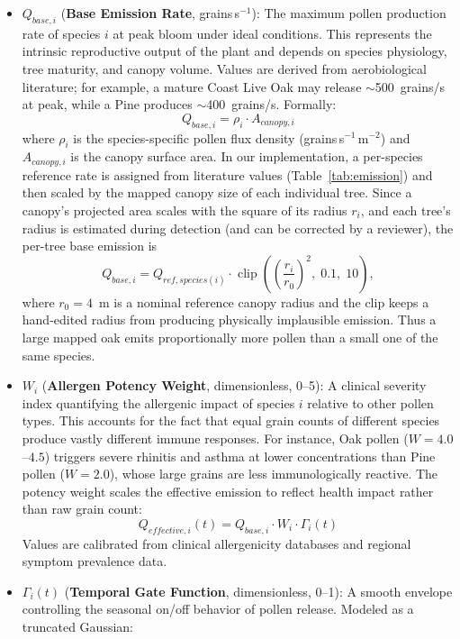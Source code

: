\documentclass[11pt]{article}
\begin{document}
\begin{itemize}
    \item $Q_{base,i}$ (\textbf{Base Emission Rate}, grains\,s$^{-1}$): The maximum pollen production rate of species $i$ at peak bloom under ideal conditions. This represents the intrinsic reproductive output of the plant and depends on species physiology, tree maturity, and canopy volume. Values are derived from aerobiological literature; for example, a mature Coast Live Oak may release $\sim$500~grains/s at peak, while a Pine produces $\sim$400~grains/s. Formally:
    \begin{equation}
    Q_{base,i} = \rho_i \cdot A_{canopy,i}
    \end{equation}
    where $\rho_i$ is the species-specific pollen flux density (grains\,s$^{-1}$\,m$^{-2}$) and $A_{canopy,i}$ is the canopy surface area. In our implementation, a per-species reference rate is assigned from literature values (Table~\ref{tab:emission}) and then scaled by the mapped canopy size of each individual tree. Since a canopy's projected area scales with the square of its radius $r_i$, and each tree's radius is estimated during detection (and can be corrected by a reviewer), the per-tree base emission is
    \begin{equation}
    Q_{base,i} = Q_{ref,species(i)} \cdot \operatorname{clip}\!\left(\left(\frac{r_i}{r_0}\right)^2,\; 0.1,\; 10\right),
    \label{eq:area_scaling}
    \end{equation}
    where $r_0 = 4$~m is a nominal reference canopy radius and the clip keeps a hand-edited radius from producing physically implausible emission. Thus a large mapped oak emits proportionally more pollen than a small one of the same species.

    \item $W_i$ (\textbf{Allergen Potency Weight}, dimensionless, 0--5): A clinical severity index quantifying the allergenic impact of species $i$ relative to other pollen types. This accounts for the fact that equal grain counts of different species produce vastly different immune responses. For instance, Oak pollen ($W = 4.0$--$4.5$) triggers severe rhinitis and asthma at lower concentrations than Pine pollen ($W = 2.0$), whose large grains are less immunologically reactive. The potency weight scales the effective emission to reflect health impact rather than raw grain count:
    \begin{equation}
    Q_{effective,i}(t) = Q_{base,i} \cdot W_i \cdot \Gamma_i(t)
    \end{equation}
    Values are calibrated from clinical allergenicity databases and regional symptom prevalence data.

    \item $\Gamma_i(t)$ (\textbf{Temporal Gate Function}, dimensionless, 0--1): A smooth envelope controlling the seasonal on/off behavior of pollen release. Modeled as a truncated Gaussian:
\end{itemize}
\end{document}

